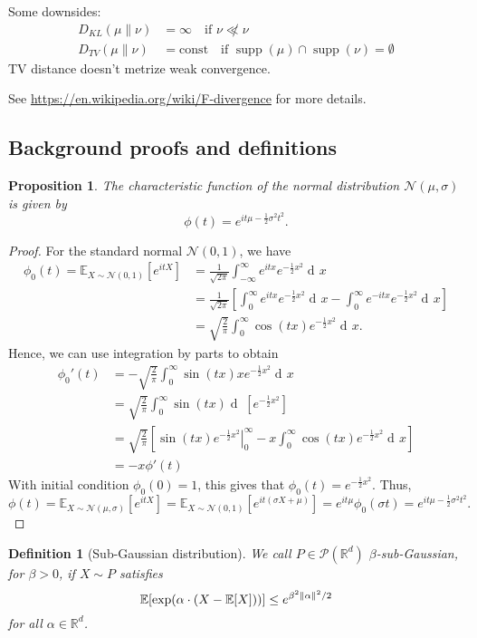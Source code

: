 \documentclass{article}
\newtheorem{proposition}[theorem]{Proposition}
\newtheorem{definition}[theorem]{Definition}
\newcommand{\dd}{\mathop{\mathrm{d}\!}}
\newcommand{\R}{\mathbb{R}}
\newcommand{\E}{\mathbb{E}}
\newcommand{\N}{\mathcal{N}}
\renewcommand{\P}{\mathcal{P}}
\DeclareMathOperator{\supp}{supp}
\DeclarePairedDelimiter{\norm}{\lVert}{\rVert}
\begin{document}
Some downsides:
\begin{align*}
    D_{KL}(\mu \parallel \nu) &= \infty \quad \text{if } \nu \not\ll \nu\\
    D_{TV}(\mu \parallel \nu) &= \text{const} \quad \text{if } \supp(\mu) \cap \supp(\nu) = \emptyset
\end{align*}
TV distance doesn't metrize weak convergence.


See \url{https://en.wikipedia.org/wiki/F-divergence} for more details.


\subsection{Background proofs and definitions}
\begin{proposition}
    The characteristic function of the normal distribution $\N(\mu,\sigma)$ is given by
    \begin{equation*}
        \phi(t) = e^{it\mu - \frac{1}{2}\sigma^2t^2}.
    \end{equation*}
\end{proposition}
\begin{proof}
    For the standard normal $\N(0,1)$, we have
    \begin{align*}
        \phi_0(t) = \E_{X \sim \N(0,1)}[e^{itX}] &= \frac{1}{\sqrt{2\pi}} \int_{-\infty}^\infty e^{itx} e^{-\frac{1}{2}x^2} \dd x\\
        &= \frac{1}{\sqrt{2\pi}} \left[ \int_{0}^\infty e^{itx} e^{-\frac{1}{2}x^2} \dd x - \int_{0}^\infty e^{-itx} e^{-\frac{1}{2}x^2} \dd x \right]\\
        &= \sqrt{\frac{2}{\pi}} \int_{0}^\infty \cos(tx) e^{-\frac{1}{2}x^2} \dd x.
    \end{align*}
    Hence, we can use integration by parts to obtain
    \begin{align*}
        \phi_0'(t) &= -\sqrt{\frac{2}{\pi}} \int_0^\infty \sin(tx)xe^{-\frac{1}{2}x^2} \dd x\\
        &= \sqrt{\frac{2}{\pi}} \int_0^\infty \sin(tx) \dd \,[e^{-\frac{1}{2}x^2}]\\
        &= \sqrt{\frac{2}{\pi}} \left[\left.\sin(tx)e^{-\frac{1}{2}x^2}\right|_0^{\infty} - x \int_0^\infty \cos(tx) e^{-\frac{1}{2}x^2} \dd x\right]\\
        &= -x \phi'(t)
    \end{align*}
    With initial condition $\phi_0(0) = 1$, this gives that $\phi_0(t) = e^{-\frac{1}{2}x^2}$. Thus,
    \begin{equation*}
        \phi(t) = \E_{X \sim \N(\mu,\sigma)}[e^{itX}] = \E_{X \sim \N(0,1)}[e^{it(\sigma X + \mu)}] = e^{it\mu} \phi_0(\sigma t) = e^{it\mu - \frac{1}{2}\sigma^2t^2}.
    \end{equation*}
\end{proof}

\begin{definition}[Sub-Gaussian distribution]
    We call $P \in \P(\R^d)$ $\beta$-sub-Gaussian, for $\beta > 0$, if $X \sim P$ satisfies
    \begin{equation*}
        \E[\exp(\alpha \cdot (X - \E[X]))] \leq e^{\beta^2 \norm{\alpha}^2/2}
    \end{equation*}
    for all $\alpha \in \R^d$.
\end{definition}
\end{document}
